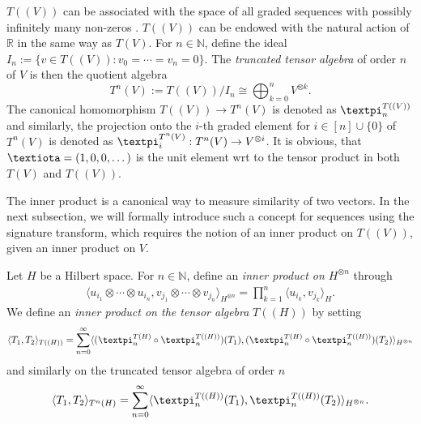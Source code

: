 \documentclass[openany]{book}
\begin{document}
\begin{definition}
    $T((V))$ can be associated with the space of all graded sequences with possibly infinitely many non-zeros \cite{lyons2022}. $T((V))$ can be endowed with the natural action of $\mathbb R$ in the same way as $T(V)$. For $n\in \mathbb N$, define the ideal $I_n:=\{v\in T((V)):v_0=\cdots =v_n=0\}$. The \textit{truncated tensor algebra} of order $n$ of $V$ is then the quotient algebra
    \begin{equation*}
        T^{n}(V):=T((V))/I_n\cong \bigoplus_{k=0}^nV^{\otimes k}.
    \end{equation*}
    The canonical homomorphism $T((V))\to T^{n}(V)$ is denoted as $\gpi_n^{T((V))}$ and similarly, the projection onto the $i$-th graded element for $i\in [n]\cup \{0\}$ of $T^n(V)$ is denoted as $\gpi_i^{T^n(V)}:T^n(V)\to V^{\otimes i}$.
    It is obvious, that $\giota=(1,0,0,\dots)$ is the unit element wrt to the tensor product in both $T(V)$ and $T((V))$.
\end{definition}
The inner product is a canonical way to measure similarity of two vectors. In the next subsection, we will formally introduce such a concept for sequences using the signature transform, which requires the notion of an inner product on $T((V))$, given an inner product on $V$.
\begin{definition}\label{tensor-prod-inner-prod}
    Let $H$ be a Hilbert space. For $n\in \mathbb N $, define an \textit{inner product on $H^{\otimes n}$} through
    \begin{equation*}
    \begin{split}
        \langle u_{i_1}\otimes \cdots \otimes u_{i_n},v_{j_1}\otimes \cdots \otimes v_{j_n}\rangle_{H^{\otimes n}}=\prod_{k=1}^n \langle u_{i_k},v_{j_k}\rangle_H.
    \end{split}
    \end{equation*} 
    We define an \textit{inner product on the tensor algebra} $T((H))$ by setting
    \begin{equation*}
        \langle T_1,T_2\rangle_{T((H))}=\sum_{n=0}^\infty\langle (\gpi_n^{T(H)}\circ \gpi_n^{T((H))})(T_1), (\gpi_n^{T(H)}\circ \gpi_n^{T((H))})(T_2)\rangle_{H^{\otimes n}}
    \end{equation*}
    and similarly on the truncated tensor algebra of order $n$
    \begin{equation*}
        \langle T_1,T_2\rangle_{T^n(H)}=\sum_{n=0}^\infty\langle \gpi_n^{T((H))}(T_1), \gpi_n^{T((H))}(T_2)\rangle_{H^{\otimes n}}.
    \end{equation*}
\end{definition}
\end{document}
